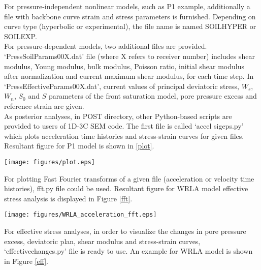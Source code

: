 For pressure-independent nonlinear models, such as P1 example, additionally a file with backbone curve strain and stress parameters is furnished. Depending on curve type (hyperbolic or experimental), the file name is named SOILHYPER or SOILEXP.  \\


For pressure-dependent models,  two additional files are provided. ‘PressSoilParams00X.dat’ file (where X refers to receiver number) includes shear modulus, Young modulus, bulk modulus, Poisson ratio, initial shear modulus after normalization and current maximum shear modulus, for each time step. In ‘PressEffectiveParams00X.dat’, current values of principal deviatoric stress, $W_{s}$, $W_{n}$, $S_{0}$ and $S$ parameters of the front saturation model, pore pressure excess and reference strain are given.   \\

As posterior analyses, in POST directory, other Python-based scripts are provided to users of 1D-3C SEM code. The first file is called ‘accel \textunderscore sigeps.py’ which plots acceleration time histories and stress-strain curves for given files. Resultant figure for P1 model is shown in \ref{plot}.


\begin{center}
\leavevmode
\texttt{[image: figures/plot.eps]} 
\label{plot} 
\vspace{1cm}
\end{center}



For plotting Fast Fourier transforms of a given file (acceleration or velocity time histories), fft.py file could be used. Resultant figure for WRLA model effective stress analysis is displayed in Figure \ref{fft}. \\


\begin{center}
\leavevmode
\texttt{[image: figures/WRLA\_acceleration\_fft.eps]} 
\label{fft} 
\vspace{1cm}
\end{center}


For effective stress analyses, in order to visualize the changes in pore pressure excess, deviatoric plan, shear modulus and stress-strain curves, ‘effective\textunderscore changes.py’ file is ready to use. An example for WRLA model is shown in Figure \ref{eff}. \\


